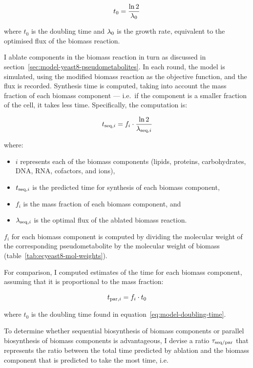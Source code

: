 \begin{equation}
  t_{0} = \frac{\ln 2}{\lambda_{0}}
  \label{eq:model-doubling-time}
\end{equation}

where $t_{0}$ is the doubling time and $\lambda_{0}$ is the growth rate, equivalent to the optimised flux of the biomass reaction.

I ablate components in the biomass reaction in turn as discussed in section~\ref{sec:model-yeast8-pseudometabolites}.
In each round, the model is simulated, using the modified biomass reaction as the objective function, and the flux is recorded.
Synthesis time is computed, taking into account the mass fraction of each biomass component --- i.e.\ if the component is a smaller fraction of the cell, it takes less time.
Specifically, the computation is:

\begin{equation}
  t_{\mathrm{seq},i} = f_{i} \cdot \frac{\ln 2}{\lambda_{\mathrm{seq},i}}
  \label{eq:model-ablated-time}
\end{equation}

where:
\begin{itemize}
  \item $i$ represents each of the biomass components (lipids, proteins, carbohydrates, DNA, RNA, cofactors, and ions),
  \item $t_{\mathrm{seq},i}$ is the predicted time for synthesis of each biomass component,
  \item $f_{i}$ is the mass fraction of each biomass component, and
  \item $\lambda_{\mathrm{seq},i}$ is the optimal flux of the ablated biomass reaction.
\end{itemize}

$f_{i}$ for each biomass component is computed by dividing the molecular weight of the corresponding pseudometabolite by the molecular weight of biomass (table~\ref{tab:ecyeast8-mol-weights}).

For comparison, I computed estimates of the time for each biomass component, assuming that it is proportional to the mass fraction:

\begin{equation}
  t_{\mathrm{par},i} = f_{i} \cdot t_{0}
  \label{eq:model-proportional-time}
\end{equation}

where $t_{0}$ is the doubling time found in equation~\ref{eq:model-doubling-time}.

To determine whether sequential biosynthesis of biomass components or parallel biosynthesis of biomass components is advantageous, I devise a ratio $\tau_{\mathrm{seq}/\mathrm{par}}$ that represents the ratio between the total time predicted by ablation and the biomass component that is predicted to take the most time, i.e.\

